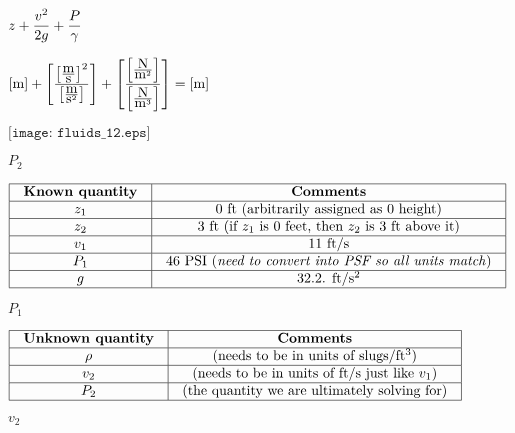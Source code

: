 \documentclass[12pt,a4paper,margin=2cm]{book}
\def\lthtmlcheckvsize{\ifdim\ht\sizebox<\vsize 
  \ifdim\wd\sizebox<\hsize\expandafter\hfill\fi \expandafter\vfill
  \else\expandafter\vss\fi}%
\begin{document}
{\newpage\clearpage
{}%
$\displaystyle z + {v^2 \over {2 g}} + {P \over \gamma}$%
\lthtmlindisplaymathZ
\lthtmlcheckvsize\clearpage}

{\newpage\clearpage
{}%
$\displaystyle [\hbox{m}] + \left[\left[\hbox{m} \over \hbox{s}\right]^2 \over \left[\hbox{m} \over \hbox{s}^2\right]\right] + \left[\left[\hbox{N} \over \hbox{m}^2 \right] \over \left[\hbox{N} \over \hbox{m}^3\right] \right] = [\hbox{m}]$%
\lthtmlindisplaymathZ
\lthtmlcheckvsize\clearpage}

{\newpage\clearpage
{}%
$\displaystyle \texttt{[image: fluids\_12.eps]}$%
\lthtmlindisplaymathZ
\lthtmlcheckvsize\clearpage}

{\newpage\clearpage
{}%
$ P_2$%
\lthtmlindisplaymathZ
\lthtmlcheckvsize\clearpage}

{\newpage\clearpage
{}%
$\displaystyle \vbox{\offinterlineskip
\halign{\strut
\vrule \quad\hfil # \  \hfil & 
\vrule \quad\hfil # \  \hfil \vrule \cr
\noalign{\hrule }
\textbf{Known quantity} & \textbf{Comments} \cr
\noalign{\hrule }
$z_1$ & 0 ft (arbitrarily assigned as 0 height) \cr
\noalign{\hrule }
$z_2$ & 3 ft (if $z_1$ is 0 feet, then $z_2$ is 3 ft above it) \cr
\noalign{\hrule }
$v_1$ & 11 ft/s \cr
\noalign{\hrule }
$P_1$ & 46 PSI (\textit{need to convert into PSF so all units match}) \cr
\noalign{\hrule }
$g$ & 32.2. ft/s$^{2}$ \cr
\noalign{\hrule }
} %
}$%
\lthtmlindisplaymathZ
\lthtmlcheckvsize\clearpage}

{\newpage\clearpage
{}%
$ P_1$%
\lthtmlindisplaymathZ
\lthtmlcheckvsize\clearpage}

{\newpage\clearpage
{}%
$\displaystyle \vbox{\offinterlineskip
\halign{\strut
\vrule \quad\hfil # \  \hfil & 
\vrule \quad\hfil # \  \hfil \vrule \cr
\noalign{\hrule }
\textbf{Unknown quantity} & \textbf{Comments} \cr
\noalign{\hrule }
$\rho$ & (needs to be in units of slugs/ft$^{3}$) \cr
\noalign{\hrule }
$v_2$ & (needs to be in units of ft/s just like $v_1$) \cr
\noalign{\hrule }
$P_2$ & (the quantity we are ultimately solving for) \cr
\noalign{\hrule }
} %
}$%
\lthtmlindisplaymathZ
\lthtmlcheckvsize\clearpage}

{\newpage\clearpage
{}%
$ v_2$%
\lthtmlindisplaymathZ
\lthtmlcheckvsize\clearpage}
\end{document}
